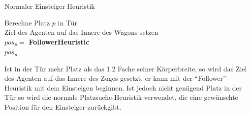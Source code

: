 \begin{algorithm} [H]
	\caption{Normaler Einsteiger Heuristik}
	\label{alg:NormalBoarding}
	
	\NormalBoardingHeuristic{} {
		Berechne Platz $p$ in Tür\\
		 {
			Ziel des Agenten auf das Innere des Wagons setzen \\
			$pos_p = $ \textbf{FollowerHeuristic} \\
		} 
		\Return $pos_p$
	}
\end{algorithm}

Ist in der Tür mehr Platz als das 1.2 Fache seiner Körperbreite, so wird das Ziel des Agenten auf das Innere des Zuges gesetzt, er kann mit der "`Follower"'-Heuristik mit dem Einsteigen beginnen. Ist jedoch nicht genügend Platz in der Tür so wird die normale Platzsuche-Heuristik verwendet, die eine gewünschte Position für den Einsteiger zurückgibt.
 
